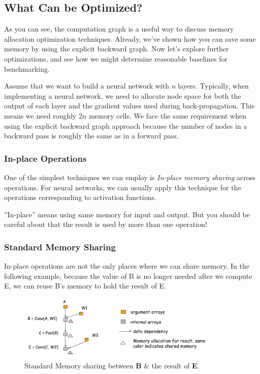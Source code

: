 \subsection{What Can be Optimized?}
As you can see, the computation graph is a useful way to discuss memory allocation optimization techniques. Already, we’ve shown how you can save some memory by using the explicit backward graph. Now let’s explore further optimizations, and see how we might determine reasonable baselines for benchmarking.

Assume that we want to build a neural network with \textit{n} layers. Typically, when implementing a neural network, we need to allocate node space for both the output of each layer and the gradient values used during back-propagation. This means we need roughly $2n$ memory cells. We face the same requirement when using the explicit backward graph approach because the number of nodes in a backward pass is roughly the same as in a forward pass.

\subsubsection{In-place Operations}
One of the simplest techniques we can employ is \textit{In-place memory sharing} across operations. For neural networks, we can usually apply this technique for the operations corresponding to activation functions. 

''In-place'' means using same memory for input and output. But you should be careful about that the result is used by more than one operation! 

\subsubsection{Standard Memory Sharing}
In-place operations are not the only places where we can share memory. In the following example, because the value of B is no longer needed after we compute E, we can reuse B’s memory to hold the result of E.
\begin{figure}[!hbtp]
\centering
\includegraphics[width=0.85\textwidth]{MXNet/alloc_normal}
\caption{Standard Memory sharing between \textbf{B} \& the result of \textbf{E}.}
\end{figure}

